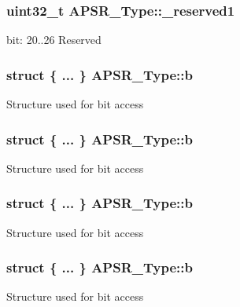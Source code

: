 \subsubsection[{\texorpdfstring{\+\_\+reserved1}{_reserved1}}]{\setlength{\rightskip}{0pt plus 5cm}uint32\+\_\+t A\+P\+S\+R\+\_\+\+Type\+::\+\_\+reserved1}\hypertarget{union_a_p_s_r___type_ac681f266e20b3b3591b961e13633ae13}{}\label{union_a_p_s_r___type_ac681f266e20b3b3591b961e13633ae13}
bit\+: 20..26 Reserved 
\subsubsection[{\texorpdfstring{b}{b}}]{\setlength{\rightskip}{0pt plus 5cm}struct \{ ... \}   A\+P\+S\+R\+\_\+\+Type\+::b}\hypertarget{union_a_p_s_r___type_aaf8972e1f4a81818ee4ad5acc6ddb1f0}{}\label{union_a_p_s_r___type_aaf8972e1f4a81818ee4ad5acc6ddb1f0}
Structure used for bit access 
\subsubsection[{\texorpdfstring{b}{b}}]{\setlength{\rightskip}{0pt plus 5cm}struct \{ ... \}   A\+P\+S\+R\+\_\+\+Type\+::b}\hypertarget{union_a_p_s_r___type_aa4f99c9e88d1b27f44bf517cab1d8087}{}\label{union_a_p_s_r___type_aa4f99c9e88d1b27f44bf517cab1d8087}
Structure used for bit access 
\subsubsection[{\texorpdfstring{b}{b}}]{\setlength{\rightskip}{0pt plus 5cm}struct \{ ... \}   A\+P\+S\+R\+\_\+\+Type\+::b}\hypertarget{union_a_p_s_r___type_a08e77fc4c13e2b1c22403ec38baf64a5}{}\label{union_a_p_s_r___type_a08e77fc4c13e2b1c22403ec38baf64a5}
Structure used for bit access 
\subsubsection[{\texorpdfstring{b}{b}}]{\setlength{\rightskip}{0pt plus 5cm}struct \{ ... \}   A\+P\+S\+R\+\_\+\+Type\+::b}\hypertarget{union_a_p_s_r___type_aebb3636b260308f4aec4857dd09514ed}{}\label{union_a_p_s_r___type_aebb3636b260308f4aec4857dd09514ed}
Structure used for bit access 
